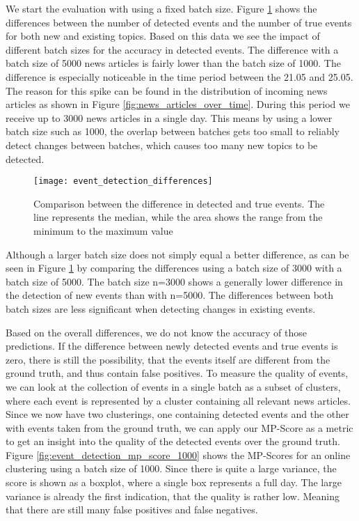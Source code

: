 We start the evaluation with using a fixed batch size. Figure \ref{fig:event_detection_differences} shows the differences between the number of detected events and the number of true events for both new and existing topics. Based on this data we see the impact of different batch sizes for the accuracy in detected events. The difference with a batch size of 5000 news articles is fairly lower than the batch size of 1000. The difference is especially noticeable in the time period between the 21.05 and 25.05. The reason for this spike can be found in the distribution of incoming news articles as shown in Figure \ref{fig:news_articles_over_time}. During this period we receive up to 3000 news articles in a single day. This means by using a lower batch size such as 1000, the overlap between batches gets too small to reliably detect changes between batches, which causes too many new topics to be detected. 

\begin{figure}[h]
    \centering
    \texttt{[image: event\_detection\_differences]}
    \caption{Comparison between the difference in detected and true events. The line represents the median, while the area shows the range from the minimum to the maximum value}
    \label{fig:event_detection_differences}
\end{figure}

Although a larger batch size does not simply equal a better difference, as can be seen in Figure \ref{fig:event_detection_differences} by comparing the differences using a batch size of 3000 with a batch size of 5000. The batch size n=3000 shows a generally lower difference in the detection of new events than with n=5000. The differences between both batch sizes are less significant when detecting changes in existing events.

Based on the overall differences, we do not know the accuracy of those predictions. 
If the difference between newly detected events and true events is zero, there is still the possibility, that the events itself are different from the ground truth, and thus contain false positives. To measure the quality of events, we can look at the collection of events in a single batch as a subset of clusters, where each event is represented by a cluster containing all relevant news articles. Since we now have two clusterings, one containing detected events and the other with events taken from the ground truth, we can apply our MP-Score as a metric to get an insight into the quality of the detected events over the ground truth. Figure \ref{fig:event_detection_mp_score_1000} shows the MP-Scores for an online clustering using a batch size of 1000. Since there is quite a large variance, the score is shown as a boxplot, where a single box represents a full day. The large variance is already the first indication, that the quality is rather low. Meaning that there are still many false positives and false negatives.

